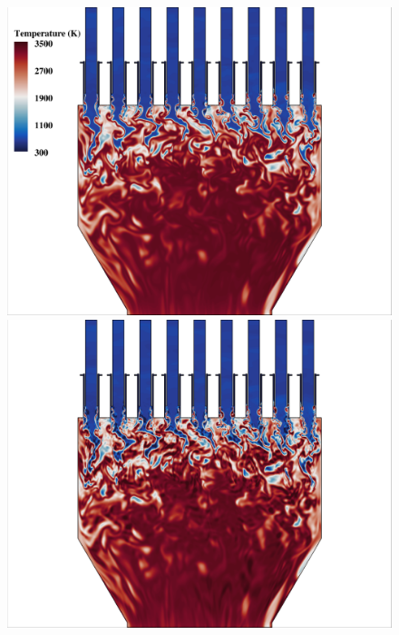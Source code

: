 \begin{figure}
	{\begin{minipage}{0.32\linewidth}
		\includegraphics[width=0.99\linewidth,trim={0.5em 0.5em 15.0em 0.5em},clip]{Chapters/HPROMResults/Images/nineElem/deim/contours/fom_temp_z.png}
	\end{minipage}
	\begin{minipage}{0.32\linewidth}
		\includegraphics[width=0.99\linewidth,trim={0.5em 0.5em 15.0em 0.5em},clip]{Chapters/HPROMResults/Images/nineElem/deim/contours/deim_0p001_temp_z.png}
	\end{minipage}
	\begin{minipage}{0.32\linewidth}

\end{minipage}}
\end{figure}
